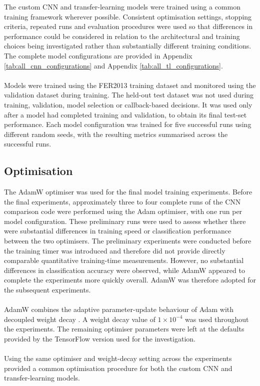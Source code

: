\documentclass[12pt, a4paper]{report}
\let\oldsubsection\subsection
\renewcommand{\subsection}{%
    \Needspace{6\baselineskip}%
    \oldsubsection
}
\begin{document}
			The custom CNN and transfer-learning models were trained using a common training framework wherever possible. Consistent optimisation settings, stopping criteria, repeated runs and evaluation procedures were used so that differences in performance could be considered in relation to the architectural and training choices being investigated rather than substantially different training conditions. The complete model configurations are provided in Appendix \ref{tab:all_cnn_configurations} and Appendix \ref{tab:all_tl_configurations}.\\\\
			Models were trained using the FER2013 training dataset and monitored using the validation dataset during training. The held-out test dataset was not used during training, validation, model selection or callback-based decisions. It was used only after a model had completed training and validation, to obtain its final test-set performance. Each model configuration was trained for five successful runs using different random seeds, with the resulting metrics summarised across the successful runs.
			
			\subsection{Optimisation}
				
				The AdamW optimiser was used for the final model training experiments. Before the final experiments, approximately three to four complete runs of the CNN comparison code were performed using the Adam optimiser, with one run per model configuration. These preliminary runs were used to assess whether there were substantial differences in training speed or classification performance between the two optimisers. The preliminary experiments were conducted before the training timer was introduced and therefore did not provide directly comparable quantitative training-time measurements. However, no substantial differences in classification accuracy were observed, while AdamW appeared to complete the experiments more quickly overall. AdamW was therefore adopted for the subsequent experiments.\\\\
				AdamW combines the adaptive parameter-update behaviour of Adam with decoupled weight decay \cite{loshchilov2019decoupled}. A weight decay value of $1 \times 10^{-4}$ was used throughout the experiments. The remaining optimiser parameters were left at the defaults provided by the TensorFlow version used for the investigation.\\\\
				Using the same optimiser and weight-decay setting across the experiments provided a common optimisation procedure for both the custom CNN and transfer-learning models.
				
\end{document}
